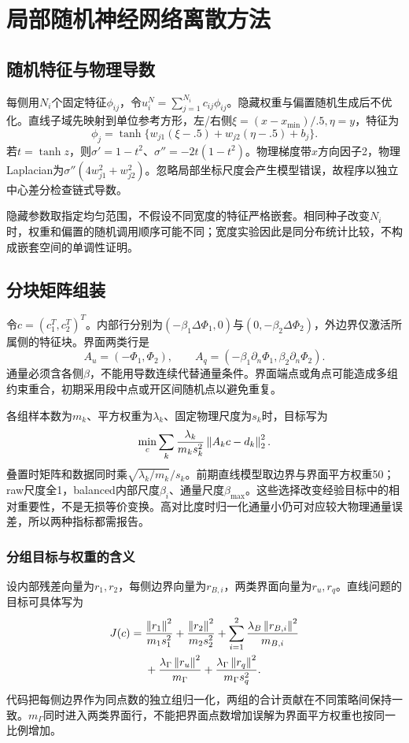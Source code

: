 \chapter{局部随机神经网络离散方法}
\section{随机特征与物理导数}
每侧用$N_i$个固定特征$\phi_{ij}$，令$u_i^N=\sum_{j=1}^{N_i}c_{ij}\phi_{ij}$。隐藏权重与偏置随机生成后不优化。直线子域先映射到单位参考方形，左/右侧$\xi=(x-x_{\min})/.5,\eta=y$，特征为
\begin{equation}
\phi_j=\tanh\{w_{j1}(\xi-.5)+w_{j2}(\eta-.5)+b_j\}.
\end{equation}
若$t=\tanh z$，则$\sigma'=1-t^2$、$\sigma''=-2t(1-t^2)$。物理梯度带$x$方向因子2，物理Laplacian为$\sigma''(4w_{j1}^2+w_{j2}^2)$。忽略局部坐标尺度会产生模型错误，故程序以独立中心差分检查链式导数。

隐藏参数取指定均匀范围，不假设不同宽度的特征严格嵌套。相同种子改变$N_i$时，权重和偏置的随机调用顺序可能不同；宽度实验因此是同分布统计比较，不构成嵌套空间的单调性证明。

\section{分块矩阵组装}
令$c=(c_1^T,c_2^T)^T$。内部行分别为$(-\beta_1\Delta\Phi_1,0)$与$(0,-\beta_2\Delta\Phi_2)$，外边界仅激活所属侧的特征块。界面两类行是
\begin{equation}
A_u=(-\Phi_1,\Phi_2),\qquad
A_q=(-\beta_1\partial_n\Phi_1,\beta_2\partial_n\Phi_2).
\end{equation}
通量必须含各侧$\beta$，不能用导数连续代替通量条件。界面端点或角点可能造成多组约束重合，初期采用段中点或开区间随机点以避免重复。

各组样本数为$m_k$、平方权重为$\lambda_k$、固定物理尺度为$s_k$时，目标写为
\begin{equation}\label{eq:weighted}
\min_c\sum_k\frac{\lambda_k}{m_ks_k^2}\left\lVert A_kc-d_k\right\rVert_2^2.
\end{equation}
叠置时矩阵和数据同时乘$\sqrt{\lambda_k/m_k}/s_k$。前期直线模型取边界与界面平方权重50；raw尺度全1，balanced内部尺度$\beta_i$、通量尺度$\beta_{\max}$。这些选择改变经验目标中的相对重要性，不是无损等价变换。高对比度时归一化通量小仍可对应较大物理通量误差，所以两种指标都需报告。

\subsection{分组目标与权重的含义}
设内部残差向量为$r_1,r_2$，每侧边界向量为$r_{B,i}$，两类界面向量为$r_u,r_q$。直线问题的目标可具体写为
\begin{align}
J(c)={}&\frac{\left\lVert r_1\right\rVert^2}{m_1s_1^2}+\frac{\left\lVert r_2\right\rVert^2}{m_2s_2^2}
+\sum_{i=1}^2\frac{\lambda_B\left\lVert r_{B,i}\right\rVert^2}{m_{B,i}}\nonumber\\
&+\frac{\lambda_\Gamma\left\lVert r_u\right\rVert^2}{m_\Gamma}
+\frac{\lambda_\Gamma\left\lVert r_q\right\rVert^2}{m_\Gamma s_q^2}.
\end{align}
代码把每侧边界作为同点数的独立组归一化，两组的合计贡献在不同策略间保持一致。$m_\Gamma$同时进入两类界面行，不能把界面点数增加误解为界面平方权重也按同一比例增加。

